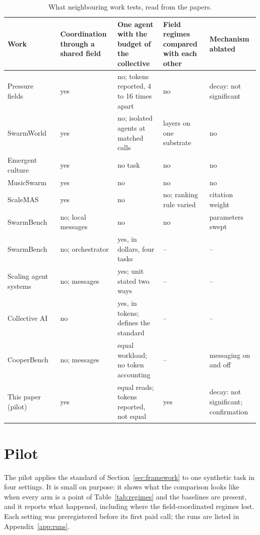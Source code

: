 \documentclass[10pt,twocolumn]{article}
\begin{document}
\begin{table}[t]
\centering\small
\begin{tabularx}{\textwidth}{@{}>{\raggedright\arraybackslash}p{3.4cm} >{\raggedright\arraybackslash}p{2.4cm} Y >{\raggedright\arraybackslash}p{3.0cm} >{\raggedright\arraybackslash}p{3.3cm}@{}}
\toprule
Work & Coordination through a shared field & One agent with the budget of the collective & Field regimes compared with each other & Mechanism ablated \\
\midrule
Pressure fields~\cite{rodriguez2026} & yes & no; tokens reported, 4 to 16 times apart & no & decay: not significant \\
SwarmWorld~\cite{pal2026} & yes & no; isolated agents at matched calls & layers on one substrate & no \\
Emergent culture~\cite{jones2026} & yes & no task & no & no \\
MusicSwarm~\cite{buehler2025} & yes & no & no & no \\
ScaleMAS~\cite{qi2026} & yes & no & no; ranking rule varied & citation weight \\
SwarmBench~\cite{ruan2025} & no; local messages & no & no & parameters swept \\
SwarmBench~\cite{gao2026} & no; orchestrator & yes, in dollars, four tasks & -- & -- \\
Scaling agent systems~\cite{kim2025} & no; messages & yes; unit stated two ways & -- & -- \\
Collective AI~\cite{fan2026} & no & yes, in tokens; defines the standard & -- & -- \\
CooperBench~\cite{khatua2026} & no; messages & equal workload; no token accounting & -- & messaging on and off \\
\midrule
This paper (pilot) & yes & equal reads; tokens reported, not equal & yes & decay: not significant; confirmation \\
\bottomrule
\end{tabularx}
\caption{What neighbouring work tests, read from the papers.}
\label{tab:related}
\end{table}

\section{Pilot}\label{sec:pilot}

The pilot applies the standard of Section~\ref{sec:framework} to one synthetic task in four settings. It is small on purpose: it shows what the comparison looks like when every arm is a point of Table~\ref{tab:regimes} and the baselines are present, and it reports what happened, including where the field-coordinated regimes lost. Each setting was preregistered before its first paid call; the runs are listed in Appendix~\ref{app:runs}.
\end{document}
